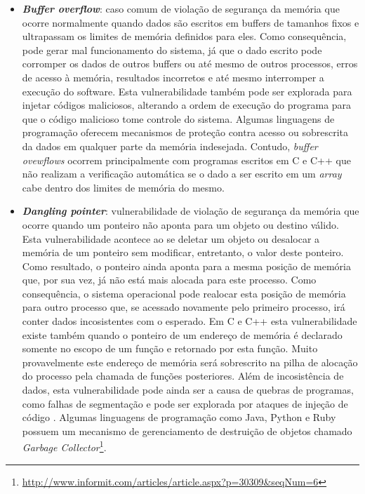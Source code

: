 \begin{itemize}
\item \textbf{\emph{Buffer overflow}}: caso comum de violação de segurança da memória que ocorre normalmente quando dados são escritos em buffers de tamanhos fixos e ultrapassam os limites de memória definidos para eles. Como consequência, pode gerar mal funcionamento do sistema, já que o dado escrito pode corromper os dados de outros buffers ou até mesmo de outros processos, erros de acesso à memória, resultados incorretos e até mesmo interromper a execução do software. Esta vulnerabilidade também pode ser explorada para injetar códigos maliciosos, alterando a ordem de execução do programa para que o código malicioso tome controle do sistema. Algumas linguagens de programação oferecem mecanismos de proteção contra acesso ou sobrescrita da dados em qualquer parte da memória indesejada. Contudo, \emph{buffer ovewflows} ocorrem principalmente com programas escritos em C e C++ que não realizam a verificação automática se o dado a ser escrito em um \emph{array} cabe dentro dos limites de memória do mesmo.
\item \textbf{\emph{Dangling pointer}}: vulnerabilidade de violação de segurança da memória que ocorre quando um ponteiro não aponta para um objeto ou destino válido. Esta vulnerabilidade acontece ao se deletar um objeto ou desalocar a memória de um ponteiro sem modificar, entretanto, o valor deste ponteiro. Como resultado, o ponteiro ainda aponta para a mesma posição de memória que, por sua vez, já não está mais alocada para este processo. Como consequência, o sistema operacional pode realocar esta posição de memória para outro processo que, se acessado novamente pelo primeiro processo, irá conter dados incosistentes com o esperado. Em C e C++ esta vulnerabilidade existe também quando o ponteiro de um endereço de memória é declarado somente no escopo de um função e retornado por esta função. Muito provavelmente este endereço de memória será sobrescrito na pilha de alocação do processo pela chamada de funções posteriores. Além de incosistência de dados, esta vulnerabilidade pode ainda ser a causa de quebras de programas, como falhas de segmentação e pode ser explorada por ataques de injeção de código \cite{afek2007}. Algumas linguagens de programação como Java, Python e Ruby possuem um mecanismo de gerenciamento de destruição de objetos chamado \emph{Garbage Collector}\footnote{\url{http://www.informit.com/articles/article.aspx?p=30309&seqNum=6}}. 

\end{itemize}
